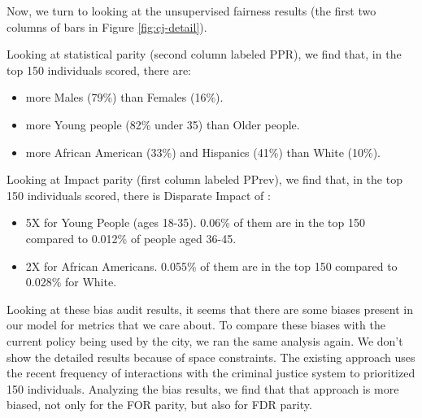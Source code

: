 Now, we turn to looking at the unsupervised fairness results (the first two columns of bars in Figure \ref{fig:cj-detail}).

Looking at statistical parity (second column labeled PPR), we find that, in the top 150 individuals scored, there are:
\begin{itemize}
\item more Males (79\%) than Females (16\%).
\item more Young people (82\% under 35) than Older people.
\item more African American (33\%) and Hispanics (41\%) than White (10\%).
\end{itemize}

Looking at Impact parity (first column labeled PPrev), we find that, in the top 150 individuals scored, there is Disparate Impact of :\begin{itemize}
\item 5X for Young People (ages 18-35). 0.06\% of them are in the top 150 compared to 0.012\% of people aged 36-45.  
\item 2X for African Americans. 0.055\% of them are in the top 150 compared to 0.028\% for White.  
\end{itemize}

Looking at these bias audit results, it seems that there are some biases present in our model for metrics that we care about. To compare these biases with the current policy being used by the city, we ran the same analysis again. We don't show the detailed results because of space constraints. The existing approach uses the recent frequency of interactions with the criminal justice system to prioritized 150 individuals. Analyzing the bias results, we find that that approach is more biased, not only for the FOR parity, but also for FDR parity. 




